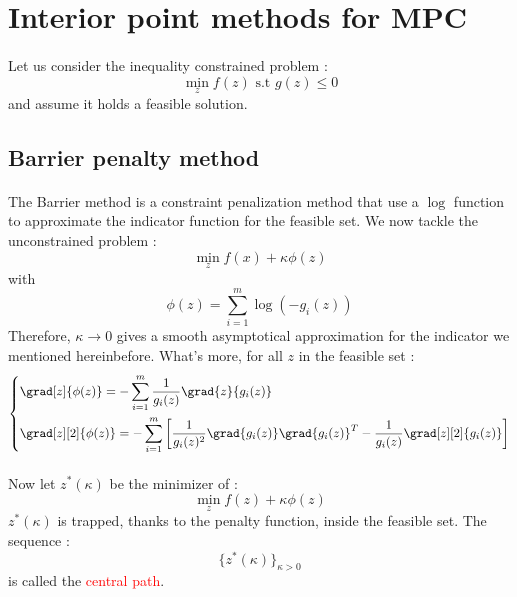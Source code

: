 \documentclass[a4paper]{article}
\begin{document}
	\section{Interior point methods for MPC}
	{
		\paragraph{} Let us consider the inequality constrained problem : 
		\begin{equation}
			\min_z f(z) \text{ s.t } g(z)\leq 0
		\end{equation}
		and assume it holds a feasible solution. 
		
		\subsection{Barrier penalty method}
		{
			\paragraph{} The Barrier method is a constraint penalization method that use a $\log$ function to approximate the indicator function for the feasible set. We now tackle the unconstrained problem : 
			\begin{equation}
				\min_z f(x)  + \kappa \phi(z)
			\end{equation}
			with 
			\begin{equation}
				\phi(z) = \sum_{i=1}^m \log{(-g_i(z))}
			\end{equation}
			Therefore, $\kappa\to 0$ gives a smooth asymptotical approximation for the indicator we mentioned hereinbefore. 
			What's more, for all $z$ in the feasible set : 
			\begin{equation}
				\left\{\begin{aligned}
					&\grad[z]{\phi(z)} =  - \sum_{i=1}^m \frac{1}{g_i(z)}\grad{z}{g_i(z)}\\
					&\grad[z][2]{\phi(z)} = -\sum_{i=1}^m \left[ \frac{1}{g_i(z)^2}\grad{g_i(z)}\grad{g_i(z)}^T - \frac{1}{g_i(z)}\grad[z][2]{g_i(z)}\right]
				\end{aligned}\right.
			\end{equation}
			
			\paragraph{} Now let $z^*(\kappa)$ be the minimizer of : 
			\begin{equation}
				\min_z f(z) + \kappa \phi(z) 
			\end{equation}
			$z^*(\kappa)$ is trapped, thanks to the penalty function, inside the feasible set. The sequence : 
			\begin{equation}
				\{z^*(\kappa)\}_{\kappa > 0} 
			\end{equation}
			is called the \textcolor{red}{central path}. 
			\vspace{10pt}
			
}}
\end{document}
